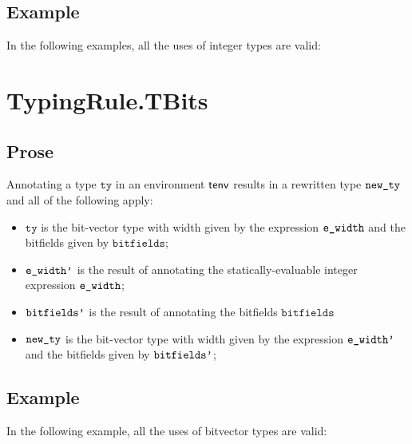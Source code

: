 \documentclass{book}
\newcommand\bitfields[0]{\texttt{bitfields}}
\newcommand\tty[0]{\texttt{ty}}
\begin{document}
\subsection{Example}

In the following examples, all the uses of integer types are valid:





\section{TypingRule.TBits \label{sec:TypingRule.TBits}}

\subsection{Prose}
Annotating a type $\tty$ in an environment $\textsf{tenv}$ results in a
rewritten type $\texttt{new\_ty}$ and all of the following apply:
\begin{itemize}
  \item $\tty$ is the bit-vector type with width given by the expression
    $\texttt{e\_width}$ and the bitfields given by $\bitfields$;
  \item $\texttt{e\_width'}$ is the result of annotating the statically-evaluable integer expression $\texttt{e\_width}$;
  \item $\texttt{bitfields'}$ is the result of annotating the bitfields $\bitfields$
  \item $\texttt{new\_ty}$ is the bit-vector type with width given by the expression
    $\texttt{e\_width'}$ and the bitfields given by $\texttt{bitfields'}$;
\end{itemize}

\subsection{Example}



In the following example, all the uses of bitvector types are valid:
\end{document}
